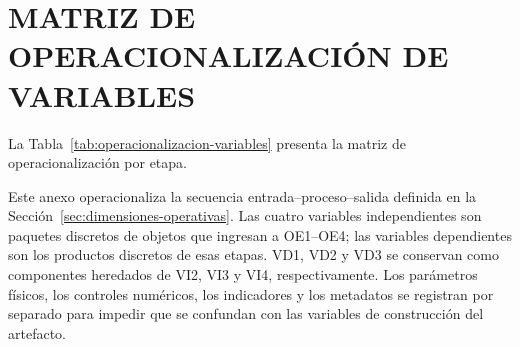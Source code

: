 \section{MATRIZ DE OPERACIONALIZACIÓN DE VARIABLES}
\label{anx:operacionalizacion-variables}
\thispagestyle{empty}

La Tabla~\ref{tab:operacionalizacion-variables} presenta la matriz de operacionalización por etapa.

Este anexo operacionaliza la secuencia entrada--proceso--salida definida en la Sección~\ref{sec:dimensiones-operativas}. Las cuatro variables independientes son paquetes discretos de objetos que ingresan a OE1--OE4; las variables dependientes son los productos discretos de esas etapas. VD1, VD2 y VD3 se conservan como componentes heredados de VI2, VI3 y VI4, respectivamente. Los parámetros físicos, los controles numéricos, los indicadores y los metadatos se registran por separado para impedir que se confundan con las variables de construcción del artefacto.

